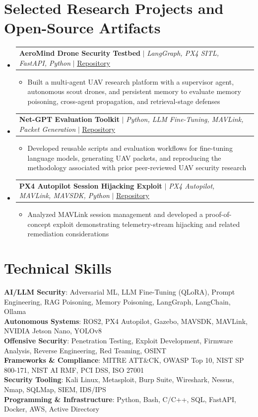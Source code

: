 \documentclass[letterpaper,11pt]{article}
\makeatletter
\newcommand{\resumeItem}[1]{
  \item\small{{#1 \vspace{-2pt}}}
}
\newcommand{\resumeProjectHeading}[2]{
    \item
    \begin{tabular*}{0.97\textwidth}{l@{\extracolsep{\fill}}r}
      \small#1 & #2 \\
    \end{tabular*}\vspace{-7pt}
}
\newcommand{\resumeSubHeadingListStart}{\begin{itemize}[leftmargin=0.15in, label={}]}
\newcommand{\resumeSubHeadingListEnd}{\end{itemize}}
\newcommand{\resumeItemListStart}{\begin{itemize}}
\newcommand{\resumeItemListEnd}{\end{itemize}\vspace{-5pt}}
\makeatother
\begin{document}
\section{Selected Research Projects and Open-Source Artifacts}
\resumeSubHeadingListStart
\resumeProjectHeading
{\textbf{AeroMind Drone Security Testbed} $|$ \emph{LangGraph, PX4 SITL, FastAPI, Python} $|$ \href{https://github.com/3odat/aeromind-uav-security-testbed}{\underline{Repository}}}{}
\resumeItemListStart
\resumeItem{Built a multi-agent UAV research platform with a supervisor agent, autonomous scout drones, and persistent memory to evaluate memory poisoning, cross-agent propagation, and retrieval-stage defenses}
\resumeItemListEnd

\resumeProjectHeading
{\textbf{Net-GPT Evaluation Toolkit} $|$ \emph{Python, LLM Fine-Tuning, MAVLink, Packet Generation} $|$ \href{https://github.com/3odat/net-gpt-evaluation-toolkit}{\underline{Repository}}}{}
\resumeItemListStart
\resumeItem{Developed reusable scripts and evaluation workflows for fine-tuning language models, generating UAV packets, and reproducing the methodology associated with prior peer-reviewed UAV security research}
\resumeItemListEnd

\resumeProjectHeading
{\textbf{PX4 Autopilot Session Hijacking Exploit} $|$ \emph{PX4 Autopilot, MAVLink, MAVSDK, Python} $|$ \href{https://github.com/3odat/px4-session-hijacking-exploit}{\underline{Repository}}}{}
\resumeItemListStart
\resumeItem{Analyzed MAVLink session management and developed a proof-of-concept exploit demonstrating telemetry-stream hijacking and related remediation considerations}
\resumeItemListEnd
\resumeSubHeadingListEnd

\section{Technical Skills}
\begin{itemize}[leftmargin=0.15in, label={}]
\small{\item{
\textbf{AI/LLM Security}{: Adversarial ML, LLM Fine-Tuning (QLoRA), Prompt Engineering, RAG Poisoning, Memory Poisoning, LangGraph, LangChain, Ollama} \\
\textbf{Autonomous Systems}{: ROS2, PX4 Autopilot, Gazebo, MAVSDK, MAVLink, NVIDIA Jetson Nano, YOLOv8} \\
\textbf{Offensive Security}{: Penetration Testing, Exploit Development, Firmware Analysis, Reverse Engineering, Red Teaming, OSINT} \\
\textbf{Frameworks \& Compliance}{: MITRE ATT\&CK, OWASP Top 10, NIST SP 800-171, NIST AI RMF, PCI DSS, ISO 27001} \\
\textbf{Security Tooling}{: Kali Linux, Metasploit, Burp Suite, Wireshark, Nessus, Nmap, SQLMap, SIEM, IDS/IPS} \\
\textbf{Programming \& Infrastructure}{: Python, Bash, C/C++, SQL, FastAPI, Docker, AWS, Active Directory}
}}
\end{itemize}
\end{document}

